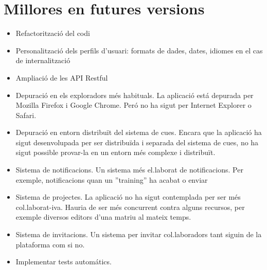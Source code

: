 \section{Millores en futures versions}
\begin{itemize}
\item Refactoritzaci\'{o} del codi
\item Personalitzaci\'{o} dels perfils d'usuari: formats de dades, dates, idiomes en el cas de internalitzaci\'{o}
\item Ampliaci\'{o} de les API Restful
\item Depuraci\'{o} en els exploradors m\'{e}s habituals. La aplicaci\'{o} est\'{a} depurada per Mozilla Firefox i Google Chrome. Per\'{o} no ha sigut per Internet Explorer o Safari.
\item Depuraci\'{o} en entorn distribuït del sistema de cues. Encara que la aplicaci\'{o} ha sigut desenvolupada per ser distribuïda i separada del sistema de cues, no ha sigut possible provar-la en un entorn m\'{e}s complexe i distribuït.
\item Sistema de notificacions. Un sistema m\'{e}s el.laborat de notificacions. Per exemple, notificacions quan un ''training'' ha acabat o enviar
\item Sistema de projectes. La aplicaci\'{o} no ha sigut contemplada per ser m\'{e}s col.laborat-iva. Hauria de ser m\'{e}s concurrent contra alguns recursos, per exemple diversos editors d'una matriu al mateix temps.
\item Sistema de invitacions. Un sistema per invitar col.laboradors tant siguin de la plataforma com si no.
\item Implementar tests autom\'{a}tics.
\end{itemize}

